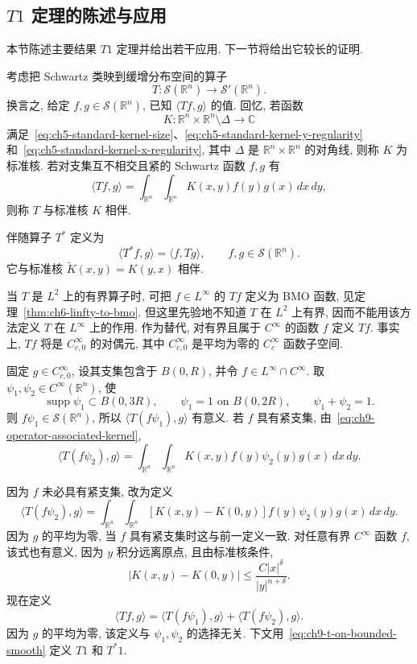 \subsection{$T1$ 定理的陈述与应用}
\label{sec:ch9-t1-statement-applications}

本节陈述主要结果 $T1$ 定理并给出若干应用. 下一节将给出它较长的证明.

考虑把 Schwartz 类映到缓增分布空间的算子
\[
 T:\mathcal S(\mathbb R^n)\longrightarrow\mathcal S'(\mathbb R^n).
\]
换言之, 给定 $f,g\in\mathcal S(\mathbb R^n)$, 已知 $\langle Tf,g\rangle$ 的值. 回忆, 若函数
\[
 K:\mathbb R^n\times\mathbb R^n\setminus\Delta\longrightarrow\mathbb C
\]
满足~\eqref{eq:ch5-standard-kernel-size}、\eqref{eq:ch5-standard-kernel-y-regularity} 和~\eqref{eq:ch5-standard-kernel-x-regularity}, 其中 $\Delta$ 是 $\mathbb R^n\times\mathbb R^n$ 的对角线, 则称 $K$ 为标准核. 若对支集互不相交且紧的 Schwartz 函数 $f,g$ 有
\begin{equation}
 \langle Tf,g\rangle
 =\int_{\mathbb R^n}\int_{\mathbb R^n}
 K(x,y)f(y)g(x)\,dx\,dy,
 \label{eq:ch9-operator-associated-kernel}
\end{equation}
则称 $T$ 与标准核 $K$ 相伴.

伴随算子 $T^*$ 定义为
\[
 \langle T^*f,g\rangle=\langle f,Tg\rangle,
 \qquad f,g\in\mathcal S(\mathbb R^n).
\]
它与标准核 $\widetilde K(x,y)=K(y,x)$ 相伴.

当 $T$ 是 $L^2$ 上的有界算子时, 可把 $f\in L^\infty$ 的 $Tf$ 定义为 BMO 函数, 见定理~\ref{thm:ch6-linfty-to-bmo}. 但这里先验地不知道 $T$ 在 $L^2$ 上有界, 因而不能用该方法定义 $T$ 在 $L^\infty$ 上的作用. 作为替代, 对有界且属于 $C^\infty$ 的函数 $f$ 定义 $Tf$. 事实上, $Tf$ 将是 $C_{c,0}^\infty$ 的对偶元, 其中 $C_{c,0}^\infty$ 是平均为零的 $C_c^\infty$ 函数子空间.

固定 $g\in C_{c,0}^\infty$, 设其支集包含于 $B(0,R)$, 并令 $f\in L^\infty\cap C^\infty$. 取 $\psi_1,\psi_2\in C^\infty(\mathbb R^n)$, 使
\[
 \operatorname{supp}\psi_1\subset B(0,3R),
 \qquad \psi_1=1\text{ on }B(0,2R),
 \qquad \psi_1+\psi_2=1.
\]
则 $f\psi_1\in\mathcal S(\mathbb R^n)$, 所以 $\langle T(f\psi_1),g\rangle$ 有意义. 若 $f$ 具有紧支集, 由~\eqref{eq:ch9-operator-associated-kernel},
\[
 \langle T(f\psi_2),g\rangle
 =\int_{\mathbb R^n}\int_{\mathbb R^n}
 K(x,y)f(y)\psi_2(y)g(x)\,dx\,dy.
\]

\hypertarget{chapter-09-page-214}{}
因为 $f$ 未必具有紧支集, 改为定义
\[
 \langle T(f\psi_2),g\rangle
 =\int_{\mathbb R^n}\int_{\mathbb R^n}
 [K(x,y)-K(0,y)]f(y)\psi_2(y)g(x)\,dx\,dy.
\]
因为 $g$ 的平均为零, 当 $f$ 具有紧支集时这与前一定义一致. 对任意有界 $C^\infty$ 函数 $f$, 该式也有意义, 因为 $y$ 积分远离原点, 且由标准核条件,
\[
 |K(x,y)-K(0,y)|\le\frac{C|x|^\delta}{|y|^{n+\delta}}.
\]
现在定义
\begin{equation}
 \langle Tf,g\rangle
 =\langle T(f\psi_1),g\rangle+\langle T(f\psi_2),g\rangle.
 \label{eq:ch9-t-on-bounded-smooth}
\end{equation}
因为 $g$ 的平均为零, 该定义与 $\psi_1,\psi_2$ 的选择无关. 下文用~\eqref{eq:ch9-t-on-bounded-smooth} 定义 $T1$ 和 $T^*1$.

